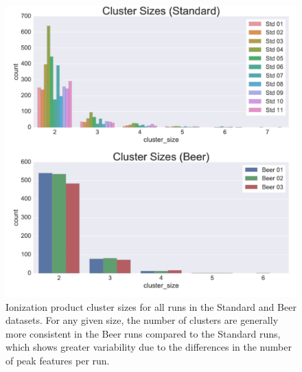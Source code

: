 \begin{figure}[!htbp]
\centering
\includegraphics[width=0.5\linewidth]{05-precursor-cluster/figures/counts_cluster.pdf}
\caption{\label{fig:cluster-counts} Ionization product cluster sizes for all runs in the Standard and Beer datasets. For any given size, the number of clusters are generally more consistent in the Beer runs compared to the Standard runs, which shows greater variability due to the differences in the number of peak features per run.}
\end{figure}


